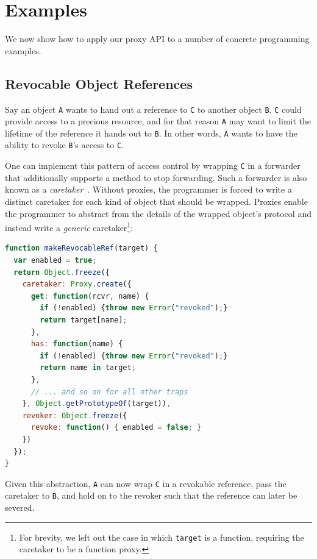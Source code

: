 \documentclass{acm_proc_article-sp}
\begin{document}
\section{Examples}
\label{sec:examples}

We now show how to apply our proxy API to a number of concrete programming examples.

\subsection{Revocable Object References}
\label{sub:revoker}

Say an object \texttt{A} wants to hand out a reference to \texttt{C} to another object \texttt{B}. \texttt{C} could provide access to a precious resource, and for that reason \texttt{A} may want to limit the lifetime of the reference it hands out to \texttt{B}. In other words, \texttt{A} wants to have the ability to revoke \texttt{B}'s access to \texttt{C}.

One can implement this pattern of access control by wrapping \texttt{C} in a forwarder that additionally supports a method to stop forwarding. Such a forwarder is also known as a \emph{caretaker}~\cite{miller06robust}. Without proxies, the programmer is forced to write a distinct caretaker for each kind of object that should be wrapped. Proxies enable the programmer to abstract from the details of the wrapped object's protocol and instead write a \emph{generic} caretaker\footnote{For brevity, we left out the case in which \texttt{target} is a function, requiring the caretaker to be a function proxy.}:

\begin{lstlisting}[language=javascript]
function makeRevocableRef(target) {
  var enabled = true;
  return Object.freeze({
    caretaker: Proxy.create({
      get: function(rcvr, name) {
        if (!enabled) {throw new Error("revoked");}
        return target[name];
      },
      has: function(name) {
        if (!enabled) {throw new Error("revoked");}
        return name in target;      
      },
      // ... and so on for all other traps
    }, Object.getPrototypeOf(target)),
    revoker: Object.freeze({
      revoke: function() { enabled = false; }
    })
  });
}
\end{lstlisting}

Given this abstraction, \texttt{A} can now wrap \texttt{C} in a revokable reference, pass the caretaker to \texttt{B}, and hold on to the revoker such that the reference can later be severed.
\end{document}
